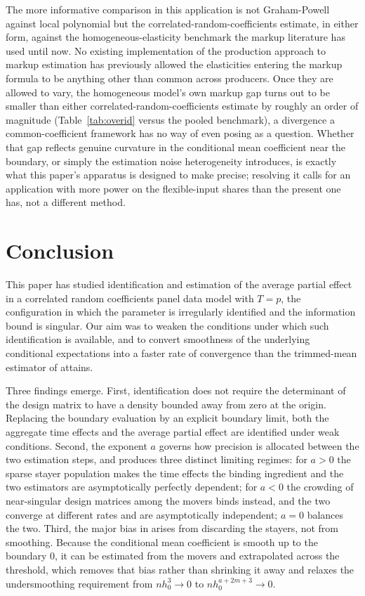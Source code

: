 \documentclass{article}
\begin{document}
The more informative comparison in this application is not Graham-Powell against local polynomial
but the correlated-random-coefficients estimate, in either form, against the homogeneous-elasticity
benchmark the markup literature has used until now. No existing implementation of the production
approach to markup estimation has previously allowed the elasticities
entering the markup formula to be anything other than common across producers. Once they are allowed
to vary, the homogeneous model's own markup gap turns out to be smaller than either
correlated-random-coefficients estimate by roughly an order of magnitude
(Table~\ref{tab:overid} versus the pooled benchmark), a divergence a common-coefficient framework has
no way of even posing as a question. Whether that gap reflects genuine curvature in the conditional
mean coefficient near the boundary, or simply the estimation noise heterogeneity introduces, is
exactly what this paper's apparatus is designed to make precise; resolving it calls for an application
with more power on the flexible-input shares than the present one has, not a different method.

\section{Conclusion}
 
This paper has studied identification and estimation of the average partial effect in a correlated
random coefficients panel data model with $T=p$, the configuration in which the parameter is
irregularly identified and the information bound is singular. Our aim was to weaken the conditions
under which such identification is available, and to convert smoothness of the underlying
conditional expectations into a faster rate of convergence than the trimmed-mean estimator of
\cite{grahampowell} attains.
 
Three findings emerge. First, identification does not require the determinant of the design matrix
to have a density bounded away from zero at the origin. Replacing the boundary evaluation by an
explicit boundary limit, both the aggregate time effects and the average partial effect are
identified under weak conditions. Second, the exponent $a$ governs
how precision is allocated between the two estimation steps, and produces three distinct limiting
regimes: for $a>0$ the sparse stayer population makes the time effects the binding ingredient and
the two estimators are asymptotically perfectly dependent; for $a<0$ the crowding of near-singular
design matrices among the movers binds instead, and the two converge at different rates and are
asymptotically independent; $a=0$ balances the two. Third, the major bias in
\cite{grahampowell} arises from discarding the stayers, not from smoothing. Because the conditional
mean coefficient is smooth up to the boundary $0$, it can be estimated from the movers and extrapolated
across the threshold, which removes that bias rather than shrinking it away and relaxes the
undersmoothing requirement from $nh_0^{3}\to0$ to $nh_0^{a+2m+3}\to0$.
 
\end{document}
